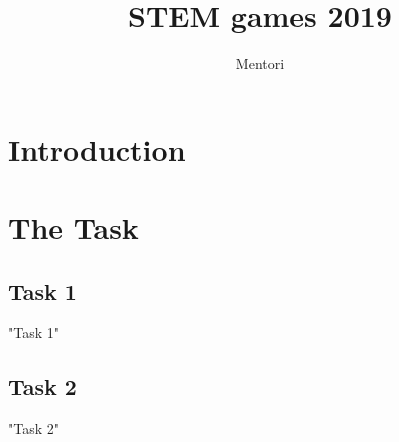\documentclass{article}
\title{STEM games 2019}
\author{Mentori}
\begin{document}
	
\maketitle



\section{Introduction}


\section{The Task}

\subsection{Task 1}

{"Task 1"}

\subsection{Task 2}

{"Task 2"}
	
	
	
\end{document}
